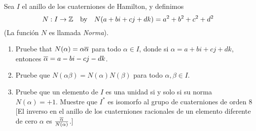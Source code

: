 \documentclass{amsart}
\begin{document}
\begin{problem}[25]
    Sea $I$ el anillo de los cuaterniones de Hamilton, y definimos
    $$ N : I \to \mathbb{Z} \quad \mbox{by} \quad N(a + bi +cj + dk) = a^2 + b^2 + c^2 + d^2$$
    (La función $N$ es llamada \emph{Norma}).

    \begin{enumerate}
        \item Pruebe that $ N(\alpha) = \alpha \overline{\alpha} $ para todo $\alpha \in I$, donde si $\alpha = a + bi + cj + dk$, entonces $\overline{\alpha} = a - bi - cj - dk$.
        \item Pruebe que $N(\alpha\beta) = N(\alpha)N(\beta)$ para todo $\alpha, \beta \in I$.
        \item Pruebe que un elemento de $I$ es una unidad si y solo si su norma $N(\alpha) = +1$. Muestre que $I^*$ es isomorfo al grupo de cuaterniones de orden 8 [El inverso en el anillo de los cuaterniones racionales de un elemento diferente de cero $\alpha$ es $\frac{\overline{\alpha}}{N(\alpha)}$.]
    \end{enumerate}
\end{problem}
\end{document}
